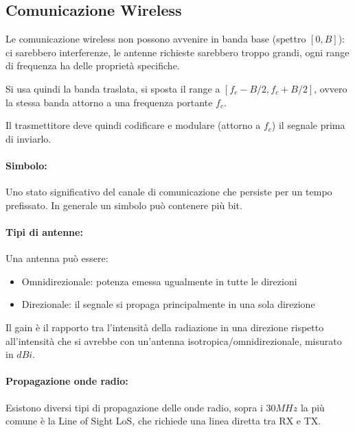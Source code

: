 \subsection{Comunicazione Wireless}

Le comunicazione wireless non possono avvenire in banda base (spettro $[0,B]$): ci sarebbero interferenze, le antenne richieste sarebbero troppo grandi, ogni range di frequenza ha delle proprietà specifiche.

Si usa quindi la banda traslata, si sposta il range a $[f_c - B/2, f_c + B/2]$, ovvero la stessa banda attorno a una frequenza portante $f_c$.

Il trasmettitore deve quindi codificare e modulare (attorno a $f_c$) il segnale prima di inviarlo.

\paragraph{Simbolo:} Uno stato significativo del canale di comunicazione che persiste per un tempo prefissato. In generale un simbolo può contenere più bit.

\paragraph{Tipi di antenne:} Una antenna può essere: 
\begin{itemize}
    \item Omnidirezionale: potenza emessa ugualmente in tutte le direzioni
    
    \item Direzionale: il segnale si propaga principalmente in una sola direzione
\end{itemize}

Il gain è il rapporto tra l'intensità della radiazione in una direzione rispetto all'intensità che si avrebbe con un'antenna isotropica/omnidirezionale, misurato in $dBi$.

\paragraph{Propagazione onde radio:} Esistono diversi tipi di propagazione delle onde radio, sopra i $30MHz$ la più comune è la Line of Sight LoS, che richiede una linea diretta tra RX e TX.

